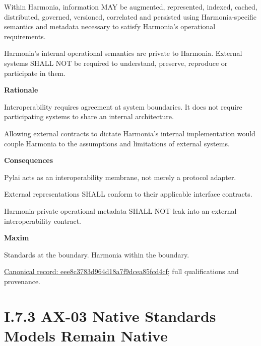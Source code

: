 Within Harmonia, information MAY be augmented, represented, indexed,
cached, distributed, governed, versioned, correlated and persisted using
Harmonia-specific semantics and metadata necessary to satisfy Harmonia's
operational requirements.



Harmonia's internal operational semantics are private to Harmonia.
External systems SHALL NOT be required to understand, preserve,
reproduce or participate in them.



\par\medskip\textbf{Rationale}\par


Interoperability requires agreement at system boundaries. It does not
require participating systems to share an internal architecture.



Allowing external contracts to dictate Harmonia's internal
implementation would couple Harmonia to the assumptions and limitations
of external systems.



\par\medskip\textbf{Consequences}\par


Pylai acts as an interoperability membrane, not merely a protocol
adapter.



External representations SHALL conform to their applicable interface
contracts.



Harmonia-private operational metadata SHALL NOT leak into an external
interoperability contract.



\par\medskip\textbf{Maxim}\par


Standards at the boundary. Harmonia within the boundary.


{\footnotesize \href{../../../../../../../../continuum/motivation/principle/eee8c3783d964d18a7f9dcea85fcd4cf.md}{Canonical record: eee8c3783d964d18a7f9dcea85fcd4cf}; full qualifications and provenance.}\par
\section*{I.7.3 AX-03 Native Standards Models Remain Native}
\label{navigation:I.7.3}

